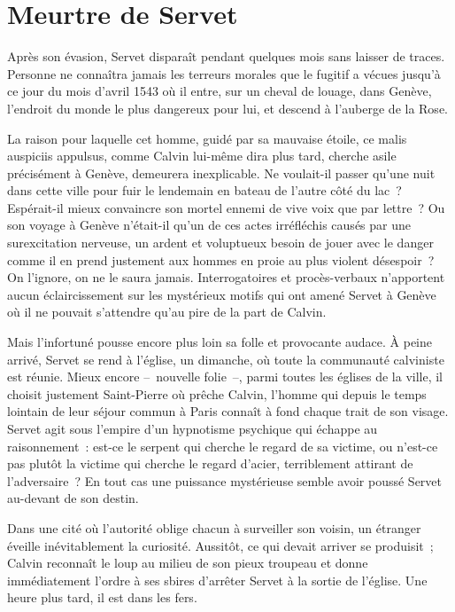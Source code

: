 \documentclass[french,twoside]{book} %
\newcommand\chapteropen{} %
\newcommand\chaptercont{} %
\begin{document}
\chapteropen
\chapter[{Meurtre de Servet}]{Meurtre de Servet}\renewcommand{\leftmark}{Meurtre de Servet}


\chaptercont
\noindent Après son évasion, Servet disparaît pendant quelques mois sans laisser de traces. Personne ne connaîtra jamais les terreurs morales que le fugitif a vécues jusqu’à ce jour du mois d’avril 1543 où il entre, sur un cheval de louage, dans Genève, l’endroit du monde le plus dangereux pour lui, et descend à l’auberge de la Rose.\par
La raison pour laquelle cet homme, guidé par sa mauvaise étoile, ce malis auspiciis appulsus, comme Calvin lui-même dira plus tard, cherche asile précisément à Genève, demeurera inexplicable. Ne voulait-il passer qu’une nuit dans cette ville pour fuir le lendemain en bateau de l’autre côté du lac ? Espérait-il mieux convaincre son mortel ennemi de vive voix que par lettre ? Ou son voyage à Genève n’était-il qu’un de ces actes irréfléchis causés par une surexcitation nerveuse, un ardent et voluptueux besoin de jouer avec le danger comme il en prend justement aux hommes en proie au plus violent désespoir ? On l’ignore, on ne le saura jamais. Interrogatoires et procès-verbaux n’apportent aucun éclaircissement sur les mystérieux motifs qui ont amené Servet à Genève où il ne pouvait s’attendre qu’au pire de la part de Calvin.\par
Mais l’infortuné pousse encore plus loin sa folle et provocante audace. À peine arrivé, Servet se rend à l’église, un dimanche, où toute la communauté calviniste est réunie. Mieux encore – nouvelle folie –, parmi toutes les églises de la ville, il choisit justement Saint-Pierre où prêche Calvin, l’homme qui depuis le temps lointain de leur séjour commun à Paris connaît à fond chaque trait de son visage. Servet agit sous l’empire d’un hypnotisme psychique qui échappe au raisonnement : est-ce le serpent qui cherche le regard de sa victime, ou n’est-ce pas plutôt la victime qui cherche le regard d’acier, terriblement attirant de l’adversaire ? En tout cas une puissance mystérieuse semble avoir poussé Servet au-devant de son destin.\par
Dans une cité où l’autorité oblige chacun à surveiller son voisin, un étranger éveille inévitablement la curiosité. Aussitôt, ce qui devait arriver se produisit ; Calvin reconnaît le loup au milieu de son pieux troupeau et donne immédiatement l’ordre à ses sbires d’arrêter Servet à la sortie de l’église. Une heure plus tard, il est dans les fers.\par
\end{document}
